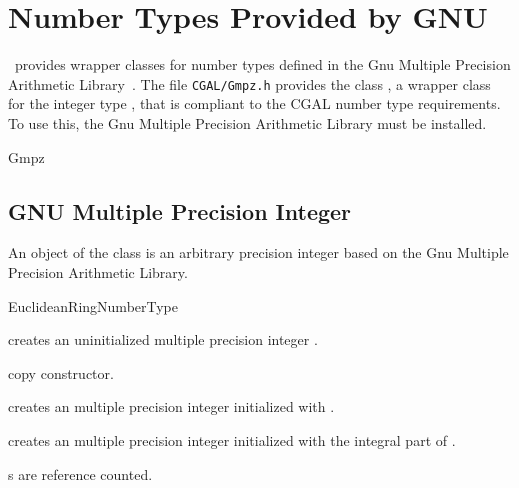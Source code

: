 \section{Number Types Provided by GNU}

\cgal\ provides wrapper classes for number types defined in the 
{\sc Gnu} Multiple Precision Arithmetic Library~\cite{g-gmpal-96}.
The file {\tt  CGAL/Gmpz.h} provides the class , 
a wrapper class for the integer type , that is compliant to the 
CGAL number type requirements.
To use this, the {\sc Gnu} Multiple Precision Arithmetic Library must be 
installed.

\begin{ccClass} {Gmpz}
\label{Gmpz}
\subsection{GNU Multiple Precision Integer}

\ccDefinition

An object of the class  is an arbitrary precision integer 
based on the {\sc Gnu} Multiple Precision Arithmetic Library. 


\ccIsModel
EuclideanRingNumberType

\ccCreation
{}

             {creates an uninitialized multiple precision integer \ccVar.}

\ccHidden {}
            {copy constructor.}

            {creates an multiple precision integer initialized with
             .}

            {creates an multiple precision integer initialized with
             the integral part of .}


\ccImplementation
{}s are reference counted.

\end{ccClass} 

